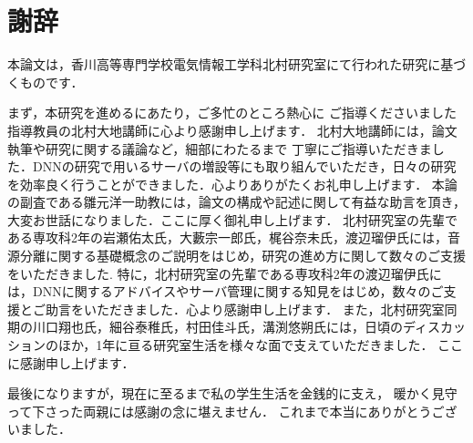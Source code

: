 \chapter{謝辞}

本論文は，香川高等専門学校電気情報工学科北村研究室にて行われた研究に基づくものです．

まず，本研究を進めるにあたり，ご多忙のところ熱心に
ご指導くださいました指導教員の北村大地講師に心より感謝申し上げます．
北村大地講師には，論文執筆や研究に関する議論など，細部にわたるまで
丁寧にご指導いただきました．DNNの研究で用いるサーバの増設等にも取り組んでいただき，日々の研究を効率良く行うことができました．心よりありがたくお礼申し上げます．
本論の副査である雛元洋一助教には，論文の構成や記述に関して有益な助言を頂き，大変お世話になりました．ここに厚く御礼申し上げます．
北村研究室の先輩である専攻科2年の岩瀬佑太氏，大藪宗一郎氏，梶谷奈未氏，渡辺瑠伊氏には，音源分離に関する基礎概念のご説明をはじめ，研究の進め方に関して数々のご支援をいただきました.
特に，北村研究室の先輩である専攻科2年の渡辺瑠伊氏には，DNNに関するアドバイスやサーバ管理に関する知見をはじめ，数々のご支援とご助言をいただきました．心より感謝申し上げます．
また，北村研究室同期の川口翔也氏，細谷泰稚氏，村田佳斗氏，溝渕悠朔氏には，日頃のディスカッションのほか，1年に亘る研究室生活を様々な面で支えていただきました．
ここに感謝申し上げます．

最後になりますが，現在に至るまで私の学生生活を金銭的に支え，
暖かく見守って下さった両親には感謝の念に堪えません．
これまで本当にありがとうございました．
